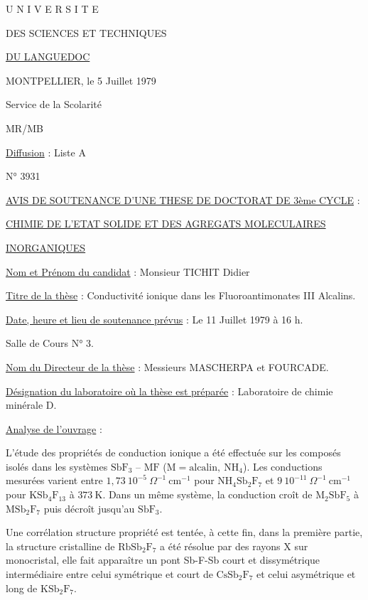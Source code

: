 

U N I V E R S I T E

DES SCIENCES ET TECHNIQUES

\uline{DU LANGUEDOC}

MONTPELLIER, le 5 Juillet 1979

Service de la Scolarité

MR/MB

\uline{Diffusion} : Liste A

N° 3931

\uline{AVIS DE SOUTENANCE D'UNE THESE DE DOCTORAT DE 3ème CYCLE} :

\uline{CHIMIE DE L'ETAT SOLIDE ET DES AGREGATS MOLECULAIRES}

\uline{INORGANIQUES}

\uline{Nom et Prénom du candidat} : Monsieur TICHIT Didier

\uline{Titre de la thèse} : Conductivité ionique dans les Fluoroantimonates III Alcalins.

\uline{Date, heure et lieu de soutenance prévus} : Le 11 Juillet 1979 à 16 h.

Salle de Cours N° 3.

\uline{Nom du Directeur de la thèse} : Messieurs MASCHERPA et FOURCADE.

\uline{Désignation du laboratoire où la thèse est préparée} : Laboratoire de chimie minérale D.

\uline{Analyse de l'ouvrage} :

L'étude des propriétés de conduction ionique a été effectuée sur les composés isolés dans les systèmes $\mathrm{SbF}_3$ -- $\mathrm{MF}$ ($\mathrm{M}=\text{alcalin},\ \mathrm{NH}_4$). Les conductions mesurées varient entre $1{,}73\ 10^{-5}\ \Omega^{-1}\ \mathrm{cm}^{-1}$ pour $\mathrm{NH}_4\mathrm{Sb}_2\mathrm{F}_7$ et $9\ 10^{-11}\ \Omega^{-1}\ \mathrm{cm}^{-1}$ pour $\mathrm{KSb}_4\mathrm{F}_{13}$ à $373\ \mathrm{K}$. Dans un même système, la conduction croît de $\mathrm{M}_2\mathrm{SbF}_5$ à $\mathrm{MSb}_2\mathrm{F}_7$ puis décroît jusqu'au $\mathrm{SbF}_3$.

Une corrélation structure propriété est tentée, à cette fin, dans la première partie, la structure cristalline de $\mathrm{RbSb}_2\mathrm{F}_7$ a été résolue par  des rayons X sur monocristal, elle fait apparaître un pont Sb-F-Sb court et dissymétrique intermédiaire entre celui symétrique et court de $\mathrm{CsSb}_2\mathrm{F}_7$ et celui asymétrique et long de $\mathrm{KSb}_2\mathrm{F}_7$.

